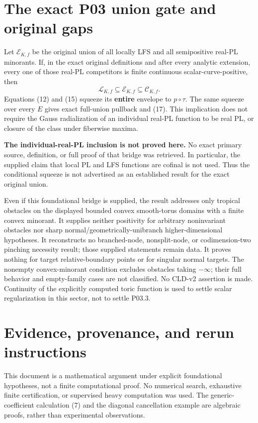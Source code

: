 \documentclass[11pt]{article}
\begin{document}
\section{The exact P03 union gate and original gaps}

Let \(\mathcal E_{K,f}\) be the original union of all locally LFS and all semipositive real-PL minorants. If, in the exact original definitions and after every analytic extension, every one of those real-PL competitors is finite continuous scalar-curve-positive, then
\[
\mathcal L_{K,f}\subseteq\mathcal E_{K,f}\subseteq\mathcal C_{K,f}.
\]
Equations (12) and (15) squeeze its \textbf{entire} envelope to \(p\circ\tau\). The same squeeze over every \(E\) gives exact full-union pullback and (17). This implication does not require the Gauss radialization of an individual real-PL function to be real PL, or closure of the class under fiberwise maxima.

\textbf{The individual-real-PL inclusion is not proved here.} No exact primary source, definition, or full proof of that bridge was retrieved. In particular, the supplied claim that local PL and LFS functions are cofinal is not used. Thus the conditional squeeze is not advertised as an established result for the exact original union.

Even if this foundational bridge is supplied, the result addresses only tropical obstacles on the displayed bounded convex smooth-torus domains with a finite convex minorant. It supplies neither positivity for arbitrary noninvariant obstacles nor sharp normal/geometrically-unibranch higher-dimensional hypotheses. It reconstructs no branched-node, nonsplit-node, or codimension-two pinching necessity result; those supplied statements remain data. It proves nothing for target relative-boundary points or for singular normal targets. The nonempty convex-minorant condition excludes obstacles taking \(-\infty\); their full behavior and empty-family cases are not classified. No CLD-v2 assertion is made. Continuity of the explicitly computed toric function is used to settle scalar regularization in this sector, not to settle P03.3.

\section{Evidence, provenance, and rerun instructions}

This document is a mathematical argument under explicit foundational hypotheses, not a finite computational proof. No numerical search, exhaustive finite certification, or supervised heavy computation was used. The generic-coefficient calculation (7) and the diagonal cancellation example are algebraic proofs, rather than experimental observations.
\end{document}
